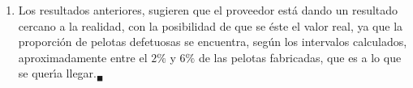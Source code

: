 \begin{solucion}
\begin{enumerate}
  \item Los resultados anteriores, sugieren que el proveedor est\'a dando un resultado cercano a la realidad, con la posibilidad de que se \'este el valor real, ya que la proporci\'on de pelotas defetuosas se encuentra, seg\'un los intervalos calculados, aproximadamente entre el $2\%$ y $6\%$ de las pelotas fabricadas, que es a lo que se quer\'{\i}a llegar.${}_{\blacksquare}$
 \end{enumerate}

\end{solucion}

